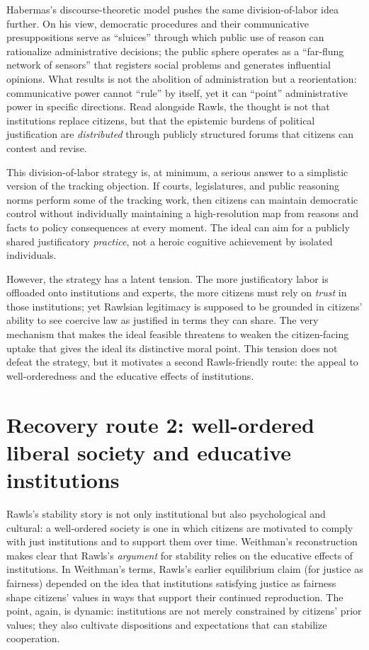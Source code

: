 \documentclass[12pt]{report}
\begin{document}
Habermas’s discourse-theoretic model pushes the same division-of-labor idea further. On his view, democratic procedures and their communicative presuppositions serve as ``sluices'' through which public use of reason can rationalize administrative decisions; the public sphere operates as a ``far-flung network of sensors'' that registers social problems and generates influential opinions. \parencite[p.~9]{habermas1994three} What results is not the abolition of administration but a reorientation: communicative power cannot ``rule'' by itself, yet it can ``point'' administrative power in specific directions. \parencite[p.~9]{habermas1994three} Read alongside Rawls, the thought is not that institutions replace citizens, but that the epistemic burdens of political justification are \emph{distributed} through publicly structured forums that citizens can contest and revise.

This division-of-labor strategy is, at minimum, a serious answer to a simplistic version of the tracking objection. If courts, legislatures, and public reasoning norms perform some of the tracking work, then citizens can maintain democratic control without individually maintaining a high-resolution map from reasons and facts to policy consequences at every moment. The ideal can aim for a publicly shared justificatory \emph{practice}, not a heroic cognitive achievement by isolated individuals.

However, the strategy has a latent tension. The more justificatory labor is offloaded onto institutions and experts, the more citizens must rely on \emph{trust} in those institutions; yet Rawlsian legitimacy is supposed to be grounded in citizens’ ability to see coercive law as justified in terms they can share. The very mechanism that makes the ideal feasible threatens to weaken the citizen-facing uptake that gives the ideal its distinctive moral point. This tension does not defeat the strategy, but it motivates a second Rawls-friendly route: the appeal to well-orderedness and the educative effects of institutions.

\section{Recovery route 2: well-ordered liberal society and educative institutions}

Rawls’s stability story is not only institutional but also psychological and cultural: a well-ordered society is one in which citizens are motivated to comply with just institutions and to support them over time. Weithman’s reconstruction makes clear that Rawls’s \emph{argument} for stability relies on the educative effects of institutions. In Weithman’s terms, Rawls’s earlier equilibrium claim (for justice as fairness) depended on the idea that institutions satisfying justice as fairness shape citizens’ values in ways that support their continued reproduction. \parencite[p.~206]{Weithman2023FixedPoints} The point, again, is dynamic: institutions are not merely constrained by citizens’ prior values; they also cultivate dispositions and expectations that can stabilize cooperation.
\end{document}
